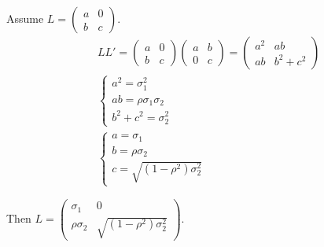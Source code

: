 \documentclass[letterpaper, 11pt]{article}
\newcommand{\1}{\mathds{1}}	%
\theoremstyle{definition}
\begin{document}
Assume $L = \begin{pmatrix}
    a & 0 \\
    b & c
\end{pmatrix}$.
\begin{align*}
    &LL' = \begin{pmatrix}
    a & 0 \\
    b & c
    \end{pmatrix}\begin{pmatrix}
    a & b \\
    0 & c
    \end{pmatrix} = \begin{pmatrix}
        a ^{2} & ab \\
        ab & b ^{2}+c ^{2}
    \end{pmatrix} \\
    &\left\{\begin{array}{l}
        a ^{2} = \sigma_{1}^{2}\\
        ab = \rho\sigma_{1}\sigma_{2}\\
        b ^{2}+ c ^{2} = \sigma_{2}^{2}
    \end{array}\right.\\
    &\left\{\begin{array}{l}
        a = \sigma_{1}\\
        b = \rho\sigma_{2}\\
        c =\sqrt{(1-\rho ^{2})\sigma_{2}^{2}}
    \end{array}\right.
\end{align*}

Then $L = \begin{pmatrix}
    \sigma_{1} & 0 \\
    \rho\sigma_{2} & \sqrt{(1-\rho ^{2})\sigma_{2}^{2}}
\end{pmatrix}$.

\end{document}

